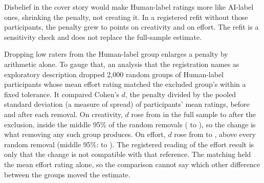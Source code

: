 Disbelief in the cover story would make Human-label ratings more like AI-label ones, shrinking the penalty, not creating it. In a registered refit without those \SOneBeliefNarrowN{} participants, the penalty grew to \SOneBeliefRefitCreatDiff{} points on creativity and \SOneBeliefRefitEffDiff{} on effort. The refit is a sensitivity check and does not replace the full-sample estimate.

Dropping low raters from the Human-label group enlarges a penalty by arithmetic alone. To gauge that, an analysis that the registration names as exploratory description dropped 2,000 random groups of \SOneBeliefNarrowN{} Human-label participants whose mean effort rating matched the excluded group's within a fixed tolerance. It compared Cohen's $d$, the penalty divided by the pooled standard deviation (a measure of spread) of participants' mean ratings, before and after each removal. On creativity, $d$ rose from \SOneDCreat{} in the full sample to \SOneBeliefRefitCreatD{} after the exclusion, inside the middle 95\% of the random removals (\SOnePlaceboCreatNullLo{} to \SOnePlaceboCreatNullHi), so the change is what removing any such group produces. On effort, $d$ rose from \SOneDEff{} to \SOneBeliefRefitEffD, above every random removal (middle 95\%: \SOnePlaceboEffNullLo{} to \SOnePlaceboEffNullHi). The registered reading of the effort result is only that the change is not compatible with that reference. The matching held the mean effort rating alone, so the comparison cannot say which other difference between the groups moved the estimate.
